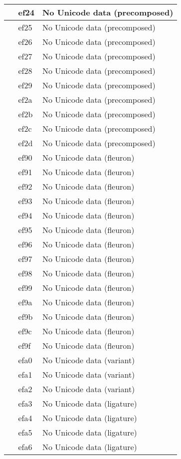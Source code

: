 \documentclass[12pt,letterpaper,openany]{book}
\begin{document}
\begin{center}
\begin{supertabular}{|m{0.25in}|m{0.5in}|m{4in}|}
 & ef24 & No Unicode data (precomposed)\\\hline
 & ef25 & No Unicode data (precomposed)\\\hline
 & ef26 & No Unicode data (precomposed)\\\hline
 & ef27 & No Unicode data (precomposed)\\\hline
 & ef28 & No Unicode data (precomposed)\\\hline
 & ef29 & No Unicode data (precomposed)\\\hline
 & ef2a & No Unicode data (precomposed)\\\hline
 & ef2b & No Unicode data (precomposed)\\\hline
 & ef2c & No Unicode data (precomposed)\\\hline
 & ef2d & No Unicode data (precomposed)\\\hline
 & ef90 & No Unicode data (fleuron)\\\hline
 & ef91 & No Unicode data (fleuron)\\\hline
 & ef92 & No Unicode data (fleuron)\\\hline
 & ef93 & No Unicode data (fleuron)\\\hline
 & ef94 & No Unicode data (fleuron)\\\hline
 & ef95 & No Unicode data (fleuron)\\\hline
 & ef96 & No Unicode data (fleuron)\\\hline
 & ef97 & No Unicode data (fleuron)\\\hline
 & ef98 & No Unicode data (fleuron)\\\hline
 & ef99 & No Unicode data (fleuron)\\\hline
 & ef9a & No Unicode data (fleuron)\\\hline
 & ef9b & No Unicode data (fleuron)\\\hline
 & ef9c & No Unicode data (fleuron)\\\hline
 & ef9f & No Unicode data (fleuron)\\\hline
 & efa0 & No Unicode data (variant)\\\hline
 & efa1 & No Unicode data (variant)\\\hline
 & efa2 & No Unicode data (variant)\\\hline
 & efa3 & No Unicode data (ligature)\\\hline
 & efa4 & No Unicode data (ligature)\\\hline
 & efa5 & No Unicode data (ligature)\\\hline
 & efa6 & No Unicode data (ligature)\\\hline

\end{supertabular}
\end{center}
\end{document}
